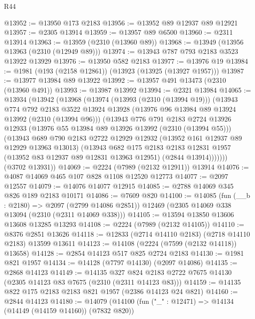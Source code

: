 \begin{lexlean}{R44}
\begin{coremodule}
@13952 := @13950 @173 @2183
@13956 := @13952 @89 @12937 @89 @12921
@13957 := @2305 @13914
@13959 := @13957 @89 @6500
@13960 := @2311 @13914
@13963 := @13959 (@2310 (@13960 @89))
@13968 := @13949 (@13956 @13963 (@2310 (@12949 @89)))
@13974 := @13943 @787 @793 @2183 @3523 @13922 @13929
@13976 := @13950 @582 @2183
@13977 := @13976 @19
@13984 := @1981 (@193 (@2158 @12861)) (@13923 (@13925 (@13927 @1957)))
@13987 := @13977 @13984 @89 @13922
@13992 := @13957 @491 @13473 (@2310 (@13960 @491))
@13993 := @13987 @13992
@13994 := @2321 @13984
@14065 := @13934
    (@13942
      (@13968
        (@13974
          (@13993 (@2310 (@13994 @19)))
          (@13943
            @774
            @792
            @2183
            @3522
            @13924
            @13928
            (@13976 @96 @13984 @89 @13924 @13992 (@2310 (@13994 @96)))
            (@13943
              @776
              @791
              @2183
              @2724
              @13926
              @12933
              (@13976 @55 @13984 @89 @13926 @13992 (@2310 (@13994 @55)))
              (@13943
                @689
                @790
                @2183
                @2722
                @12929
                @12932
                (@13952 @161 @12937 @89 @12929 @13963 @13013)
                (@13943
                  @682
                  @175
                  @2183
                  @2183
                  @12831
                  @1957
                  (@13952 @83 @12937 @89 @12831 @13963 @12951)
                  (@2844 @13914)))))))
      (@3702 @13931))
@14069 := @2224 (@7989 (@2132 @12911)) @13914
@14076 := @4087 @14069 @465 @107 @828 @1108 @12520 @12773
@14077 := @2097 @12557
@14079 := @14076 @14077 @12915
@14085 := @2788 @14069 @345 @826 @189 @2183 @10171
@14086 := @7609 @820
@14100 := @14085
    (fun (__b : @2180) => @2097 (@2799 @14086 @2851))
    @12469
    (@2305 @14069 @338 @13094 (@2310 (@2311 @14069 @338)))
@14105 := @13594 @13850 @13606 @13608 @13285 @13293
@14108 := @2224 (@7989 (@2132 @14105))
@14110 := @8376 @2851 @13626
@14118 := @12833 (@2714 @14110 @2183) (@2718 @14110 @2183) @13599 @13611
@14123 := @14108 (@2224 (@7599 (@2132 @14118)) @13658)
@14128 := @2854 @14123 @517 @825 @2724 @2183
@14130 := @1981 @821 @1957
@14134 := @14128 (@7797 @14130) (@2097 @14086)
@14135 := @2868 @14123
@14149 := @14135
    @327
    @824
    @2183
    @2722
    @7675
    @14130
    (@2305 @14123 @83 @7675 (@2310 (@2311 @14123 @83)))
@14159 := @14135 @822 @175 @2183 @2183 @821 @1957 (@2386 @14123 @24 @821)
@14160 := @2844 @14123
@14180 := @14079
    (@14100
      (fun ("_" : @12471) => @14134 (@14149 (@14159 @14160)) (@7832 @820))

\end{coremodule}
\end{lexlean}
